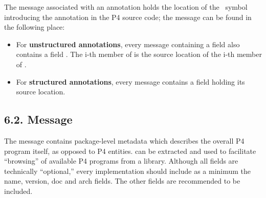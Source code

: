 \documentclass[11pt]{article}
\begin{document}
{%
The  message associated with an annotation holds the location of
the  symbol introducing the annotation in the P4 source code; the message can
be found in the following place:%

\begin{itemize}%

\item{}
For \textbf{unstructured annotations}, every message containing a field
 also contains a field
. The i-th member of
 is the source location of the i-th member of
.%

\item{}
For \textbf{structured annotations}, every  message contains
a field  holding its source location.%
\end{itemize}%

\subsection{6.2.\hspace*{0.5em} Message}\label{sec-pkginfo-message}%

\noindent{}The  message contains package-level metadata which describes the
overall P4 program itself, as opposed to P4 entities.  can be extracted
and used to facilitate \textquotedblleft{}browsing\textquotedblright{} of available P4 programs from a
library. Although all fields are technically \textquotedblleft{}optional,\textquotedblright{} every implementation
should include as a minimum the name, version, doc and arch fields. The other
fields are recommended to be included.%

}
\end{document}
